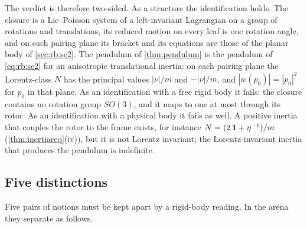 The verdict is therefore two-sided. As a structure the identification holds. The closure is a Lie--Poisson system of a left-invariant
Lagrangian on a group of rotations and translations, its reduced motion on every leaf is one rotation angle, and on each pairing plane its
bracket and its equations are those of the planar body of \cref{sec:rb:se2}. The pendulum of \cref{thm:pendulum} is the pendulum of
\eqref{eq:rb:se2} for an anisotropic translational inertia: on each pairing plane the Lorentz-class $N$ has the principal values $|\nu|/m$ and
$-|\nu|/m$, and $|w(p_0)|=|p_0|^2$ for $p_0$ in that plane. As an identification with a free rigid body it fails: the closure contains no rotation group $SO(3)$, and it maps to one at
most through its rotor. As an identification with a physical body it fails as well. A positive inertia that couples the rotor to the frame exists,
for instance $N=(2\,\mathbf 1+\eta^{-1})/m$ (\cref{thm:inertiareq}(iv)), but it is not Lorentz invariant; the Lorentz-invariant inertia that produces
the pendulum is indefinite.

\subsection{Five distinctions}
\label{sec:esmap:distinctions}

Five pairs of notions must be kept apart by a rigid-body reading. In the arena they separate as follows.

